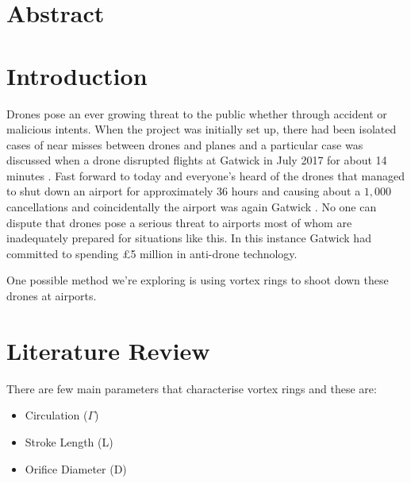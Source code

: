 \documentclass[a4paper,12pt]{article}
\begin{document}
\section*{Abstract}
\newpage
\tableofcontents
\newpage
 \printnomenclature
 \newpage
\section{Introduction}
 Drones pose an ever growing threat to the public whether through accident or malicious intents. When the project was initially set up, there had been isolated cases of near misses between drones and planes and a particular case was discussed when a drone disrupted flights at Gatwick in July 2017 for about 14 minutes \cite{RefWorks:42}. Fast forward to today and everyone's heard of the drones that managed to shut down an airport for approximately $36$ hours and causing about a $1,000$ cancellations and coincidentally the airport was again Gatwick \cite{Gatwick}. No one can dispute that drones pose a serious threat to airports most of whom are inadequately prepared for situations like this. In this instance Gatwick had committed to spending £5 million in anti-drone technology.
\vspace{\baselineskip}

\noindent One possible method we're exploring is using vortex rings to shoot down these drones at airports.

\section{Literature Review}
There are few main parameters that characterise vortex rings and these are:
\begin{itemize}
    \item Circulation ($\Gamma$)
    \item Stroke Length (L)
    \item Orifice Diameter (D)
\end{itemize}
\end{document}
